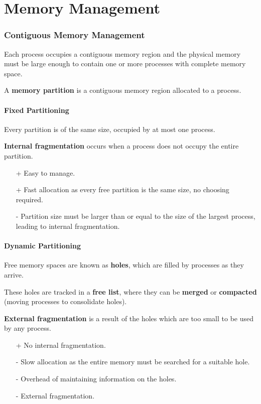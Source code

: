 \part{Memory Management}

\section{Contiguous Memory Management}
Each process occupies a contiguous memory region and the physical memory must be large enough to contain one or more processes with complete memory space.

A \textbf{memory partition} is a contiguous memory region allocated to a process.

\subsection{Fixed Partitioning}
Every partition is of the same size, occupied by at most one process.

\textbf{Internal fragmentation} occurs when a process does not occupy the entire partition.

\begin{itemize}
    \item[+] Easy to manage.
    \item[+] Fast allocation as every free partition is the same size, no choosing required.
    \item[-] Partition size must be larger than or equal to the size of the largest process, leading to internal fragmentation.
\end{itemize}

\subsection{Dynamic Partitioning}
Free memory spaces are known as \textbf{holes}, which are filled by processes as they arrive.

These holes are tracked in a \textbf{free list}, where they can be \textbf{merged} or \textbf{compacted} (moving processes to consolidate holes).

\textbf{External fragmentation} is a result of the holes which are too small to be used by any process.

\begin{itemize}
    \item[+] No internal fragmentation.
    \item[-] Slow allocation as the entire memory must be searched for a suitable hole.
    \item[-] Overhead of maintaining information on the holes.
    \item[-] External fragmentation.
\end{itemize}

